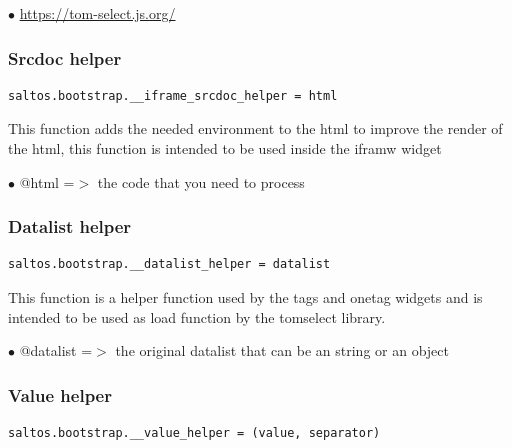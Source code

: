 \documentclass[a4paper]{article}
\def\htmladdnormallink#1#2{\href{#2}{#1}}
\begin{document}
\begin{compactitem}
\item[\color{myblue}$\bullet$] \htmladdnormallink{https://tom-select.js.org/}{https://tom-select.js.org/}
\end{compactitem}

\hypertarget{toc81}{}
\subsubsection{Srcdoc helper}

\begin{lstlisting}
saltos.bootstrap.__iframe_srcdoc_helper = html
\end{lstlisting}

This function adds the needed environment to the html to improve the
render of the html, this function is intended to be used inside the
iframw widget

\begin{compactitem}
\item[\color{myblue}$\bullet$] @html =$>$ the code that you need to process
\end{compactitem}

\hypertarget{toc82}{}
\subsubsection{Datalist helper}

\begin{lstlisting}
saltos.bootstrap.__datalist_helper = datalist
\end{lstlisting}

This function is a helper function used by the tags and onetag widgets
and is intended to be used as load function by the tomselect library.

\begin{compactitem}
\item[\color{myblue}$\bullet$] @datalist =$>$ the original datalist that can be an string or an object
\end{compactitem}

\hypertarget{toc83}{}
\subsubsection{Value helper}

\begin{lstlisting}
saltos.bootstrap.__value_helper = (value, separator)
\end{lstlisting}
\end{document}
